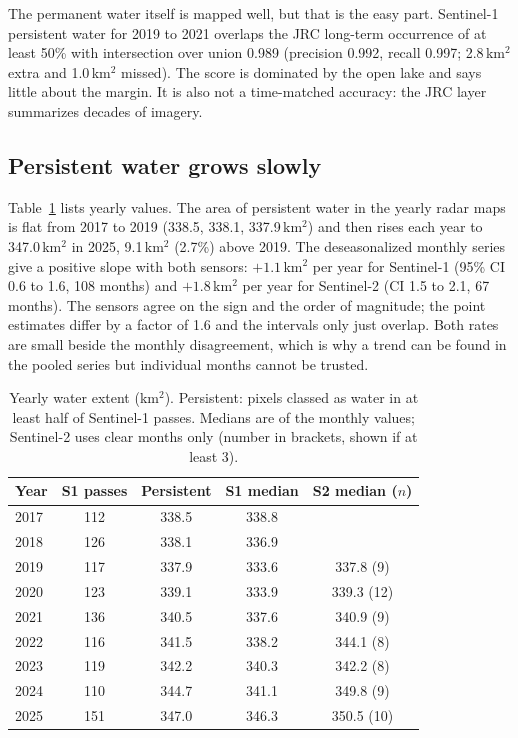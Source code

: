 \documentclass[conference]{IEEEtran}
\begin{document}
The permanent water itself is mapped well, but that is the easy part. Sentinel-1 persistent water for 2019 to 2021 overlaps the JRC long-term occurrence of at least 50\% with intersection over union 0.989 (precision 0.992, recall 0.997; 2.8\,km$^2$ extra and 1.0\,km$^2$ missed). The score is dominated by the open lake and says little about the margin. It is also not a time-matched accuracy: the JRC layer summarizes decades of imagery.

\subsection{Persistent water grows slowly}
Table~\ref{tab:annual} lists yearly values. The area of persistent water in the yearly radar maps is flat from 2017 to 2019 (338.5, 338.1, 337.9\,km$^2$) and then rises each year to 347.0\,km$^2$ in 2025, 9.1\,km$^2$ (2.7\%) above 2019. The deseasonalized monthly series give a positive slope with both sensors: $+1.1$\,km$^2$ per year for Sentinel-1 (95\% CI 0.6 to 1.6, 108 months) and $+1.8$\,km$^2$ per year for Sentinel-2 (CI 1.5 to 2.1, 67 months). The sensors agree on the sign and the order of magnitude; the point estimates differ by a factor of 1.6 and the intervals only just overlap. Both rates are small beside the monthly disagreement, which is why a trend can be found in the pooled series but individual months cannot be trusted.

\begin{table}[t]
\centering
\caption{Yearly water extent (km$^2$). Persistent: pixels classed as water in at least half of Sentinel-1 passes. Medians are of the monthly values; Sentinel-2 uses clear months only (number in brackets, shown if at least 3).}
\label{tab:annual}
\small
\begin{tabular}{lcccc}
\toprule
Year & S1 passes & Persistent & S1 median & S2 median ($n$) \\
\midrule
2017 & 112 & 338.5 & 338.8 & \\
2018 & 126 & 338.1 & 336.9 & \\
2019 & 117 & 337.9 & 333.6 & 337.8 (9) \\
2020 & 123 & 339.1 & 333.9 & 339.3 (12) \\
2021 & 136 & 340.5 & 337.6 & 340.9 (9) \\
2022 & 116 & 341.5 & 338.2 & 344.1 (8) \\
2023 & 119 & 342.2 & 340.3 & 342.2 (8) \\
2024 & 110 & 344.7 & 341.1 & 349.8 (9) \\
2025 & 151 & 347.0 & 346.3 & 350.5 (10) \\
\bottomrule
\end{tabular}
\end{table}
\end{document}
